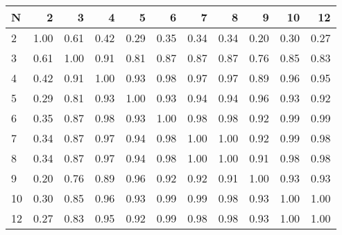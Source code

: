 \begin{tabular}{lrrrrrrrrrr}
\toprule
N &    2  &    3  &    4  &    5  &    6  &    7  &    8  &    9  &    10 &    12 \\
\midrule
2  &  1.00 &  0.61 &  0.42 &  0.29 &  0.35 &  0.34 &  0.34 &  0.20 &  0.30 &  0.27 \\
3  &  0.61 &  1.00 &  0.91 &  0.81 &  0.87 &  0.87 &  0.87 &  0.76 &  0.85 &  0.83 \\
4  &  0.42 &  0.91 &  1.00 &  0.93 &  0.98 &  0.97 &  0.97 &  0.89 &  0.96 &  0.95 \\
5  &  0.29 &  0.81 &  0.93 &  1.00 &  0.93 &  0.94 &  0.94 &  0.96 &  0.93 &  0.92 \\
6  &  0.35 &  0.87 &  0.98 &  0.93 &  1.00 &  0.98 &  0.98 &  0.92 &  0.99 &  0.99 \\
7  &  0.34 &  0.87 &  0.97 &  0.94 &  0.98 &  1.00 &  1.00 &  0.92 &  0.99 &  0.98 \\
8  &  0.34 &  0.87 &  0.97 &  0.94 &  0.98 &  1.00 &  1.00 &  0.91 &  0.98 &  0.98 \\
9  &  0.20 &  0.76 &  0.89 &  0.96 &  0.92 &  0.92 &  0.91 &  1.00 &  0.93 &  0.93 \\
10 &  0.30 &  0.85 &  0.96 &  0.93 &  0.99 &  0.99 &  0.98 &  0.93 &  1.00 &  1.00 \\
12 &  0.27 &  0.83 &  0.95 &  0.92 &  0.99 &  0.98 &  0.98 &  0.93 &  1.00 &  1.00 \\
\bottomrule
\end{tabular}
